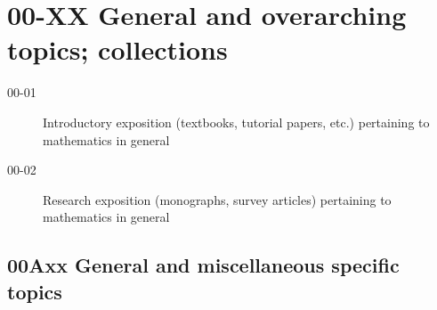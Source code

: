 \section*{00-XX General and overarching topics; collections}\label{00-XX}
\begin{description}
\item [00-01]\label{00-01} Introductory exposition (textbooks, tutorial papers, etc.) pertaining to mathematics in general 
\item [00-02]\label{00-02} Research exposition (monographs, survey articles) pertaining to mathematics in general
\end{description}
\subsection*{00Axx  General and miscellaneous specific topics }\label{00Axx}
